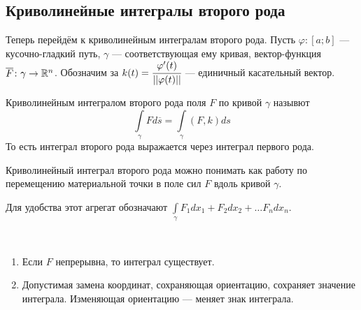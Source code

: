 \subsection{Криволинейные интегралы второго рода}
Теперь перейдём к криволинейным интегралам второго рода. Пусть $\varphi\colon [a;b]$ --- кусочно-гладкий путь, $\gamma$ --- соответствующая ему кривая, вектор-функция $\overline{F} \colon \gamma \to \mathbb{R}^n$. Обозначим за $k(t) = \cfrac{\varphi'(t)}{||\varphi(t)||}$ --- единичный касательный вектор.
\begin{Def}
    Криволинейным интегралом второго рода поля $F$ по кривой $\gamma$ назывют
    $$
        \int\limits_\gamma Fd \overline s = \int\limits_{\gamma} (F, k)ds
    $$
    То есть интеграл второго рода выражается через интеграл первого рода.
\end{Def}
Криволинейный интеграл второго рода можно понимать как работу по перемещению материальной точки в поле сил $F$ вдоль кривой $\gamma$.
\par Для удобства этот агрегат обозначают $\int\limits_\gamma F_1dx_1 + F_2dx_2 + \ldots F_ndx_n$. 
\begin{Properties}\ \\
    \begin{enumerate}
        \item Если $F$ непрерывна, то интеграл существует.
        \item Допустимая замена координат, сохраняющая ориентацию, сохраняет значение интеграла. Изменяющая ориентацию --- меняет знак интеграла.
    \end{enumerate}
\end{Properties}

